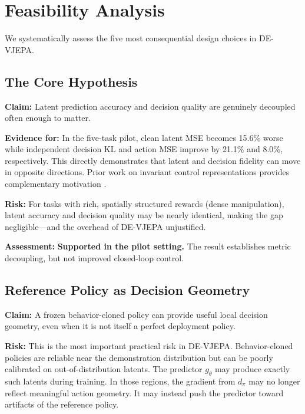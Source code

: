 \documentclass[10pt,twocolumn]{article}
\theoremstyle{tightstyle}
\begin{document}
\section{Feasibility Analysis}
\label{sec:feasibility}

We systematically assess the five most consequential design choices in DE-VJEPA.

\subsection{The Core Hypothesis}

\textbf{Claim:} Latent prediction accuracy and decision quality are genuinely
decoupled often enough to matter.

\medskip
\textbf{Evidence for:}
In the five-task pilot, clean latent MSE becomes 15.6\% worse while independent
decision KL and action MSE improve by 21.1\% and 8.0\%, respectively.
This directly demonstrates that latent and decision fidelity can move in opposite
directions. Prior work on invariant control representations provides complementary
motivation \citep{zhang2020learning}.

\medskip
\textbf{Risk:} For tasks with rich, spatially structured rewards (dense manipulation),
latent accuracy and decision quality may be nearly identical, making the gap
negligible---and the overhead of DE-VJEPA unjustified.

\medskip
\textbf{Assessment:} \textcolor{feasgreen}{\textbf{Supported in the pilot setting.}}
The result establishes metric decoupling, but not improved closed-loop control.

\subsection{Reference Policy as Decision Geometry}

\textbf{Claim:}
A frozen behavior-cloned policy can provide useful local decision geometry, even
when it is not itself a perfect deployment policy.

\medskip
\textbf{Risk:}
This is the most important practical risk in DE-VJEPA.
Behavior-cloned policies are reliable near the demonstration distribution but can
be poorly calibrated on out-of-distribution latents.
The predictor $g_\theta$ may produce exactly such latents during training.
In those regions, the gradient from $d_\pi$ may no longer reflect meaningful action
geometry.
It may instead push the predictor toward artifacts of the reference policy.
\end{document}
